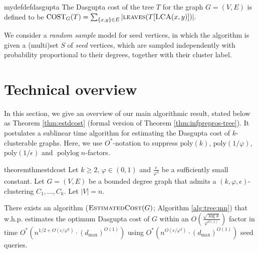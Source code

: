 \documentclass[letterpaper,11pt]{article}
\newcommand{\lca}{\textsc{LCA}}
\newcommand{\CT}{\text{COST}}
\newcommand{\lv}{\textsc{leaves}}
\theoremstyle{plain}
\theoremstyle{definition}
\theoremstyle{remark}
\newcommand{\e}{\epsilon}
\newcommand{\poly}{\text{poly}}
\def\polylog{\operatorname{polylog}}
\begin{document}
\begin{restatable}{mydef}{defdasgupta} 
\label{def:dasgupta-cost}
The Dasgupta cost of the tree $T$ for the graph $G = (V, E)$ is defined to be
$\CT_G(T) = \sum_{\{x,y\}\in E} |\lv(T[\lca(x, y)])|\text{.}$
\end{restatable}



 We consider a  {\em random sample} model for seed vertices, in which the algorithm is given a (multi)set $S$ of {\em seed} vertices, which are sampled independently with probability proportional to their degrees, together with their cluster label. 




\section{Technical overview}

In this section, we give an overview of our main algorithmic result, stated below as Theorem \ref{thm:estdcost} (formal version of Theorem \ref{thm:infprepros-tree}). 
It postulates a sublinear time algorithm for estimating the Dasgupta cost of $k$-clusterable graphs. Here, we use $O^*$-notation to suppress $\poly(k)$, $\poly(1/\varphi)$, $\poly(1/\e)$  and $\polylog n$-factors. 

\begin{restatable}{theorem}{thmestdcost} \label{thm:estdcost}
	Let $k \geq 2$, $\varphi \in (0,1)$ and $\frac{\epsilon}{\varphi^2}$ be a sufficiently small constant. Let $G=(V,E)$ be a bounded degree graph that admits a $(k,\varphi,\epsilon)$-clustering $C_1, \ldots , C_k$. Let $|V|=n$. 

	There exists an algorithm ($\textsc{EstimatedCost}(G)$; Algorithm 
	\ref{alg:tree:mn}) that
	w.h.p. estimates the optimum Dasgupta cost of $G$ within an $O\left(\frac{\sqrt{\log k}}{\varphi^{O(1)}}\right)$ factor in time 
	$O^*\left(n^{1/2+O(\e/\varphi^2)} \cdot  (d_{\max})^{O(1)}\right)$ using $O^*\left(n^{O(\e/\varphi^2)}\cdot (d_{\max})^{O(1)}\right)$ seed queries.
\end{restatable}
\end{document}
